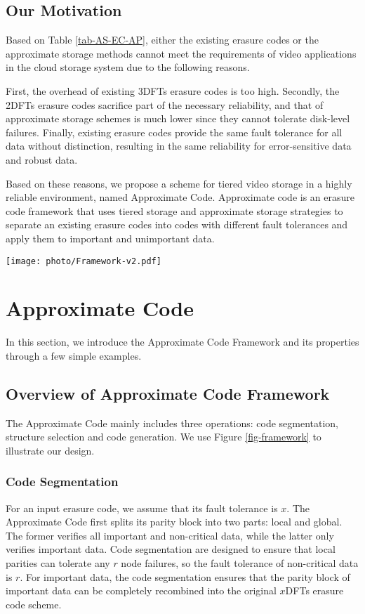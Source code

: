 \documentclass[sigconf]{acmart}
\begin{document}
\subsection{Our Motivation}
Based on Table \ref{tab-AS-EC-AP}, either the existing erasure codes or the approximate storage methods cannot meet the requirements of video applications in the cloud storage system due to the following reasons. 

First, the overhead of existing 3DFTs erasure codes is too high.
Secondly, the 2DFTs erasure codes sacrifice part of the necessary reliability, and that of approximate storage schemes is much lower since they cannot tolerate disk-level failures.
Finally, existing erasure codes provide the same fault tolerance for all data without distinction, resulting in the same reliability for error-sensitive data and robust data.

Based on these reasons, we propose a scheme for tiered video storage in a highly reliable environment, named Approximate Code.
Approximate code is an erasure code framework that uses tiered storage\cite{krish2014hats} \cite{wang2014balancing} \cite{zhang2010automated} \cite{udipi2012lot} and approximate storage strategies to separate an existing erasure codes into codes with different fault tolerances and apply them to important and unimportant data.

\begin{figure*}[ht!]
\centering
\texttt{[image: photo/Framework-v2.pdf]}
\caption{The framework of Approximate Code}
\label{fig-framework}
\end{figure*}

\section{Approximate Code}\label{ApCode}
In this section, we introduce the Approximate Code Framework and its properties through a few simple examples. 

\subsection{Overview of Approximate Code Framework}
The Approximate Code mainly includes three operations: code segmentation, structure selection and code generation. We use Figure \ref{fig-framework} to illustrate our design.

\subsubsection{Code Segmentation}
For an input erasure code, we assume that its fault tolerance is $x$. The Approximate Code first splits its parity block into two parts: local and global. The former verifies all important and non-critical data, while the latter only verifies important data. Code segmentation are designed to ensure that local parities can tolerate any $r$ node failures, so the fault tolerance of non-critical data is $r$. For important data, the code segmentation ensures that the parity block of important data can be completely recombined into the original $x$DFTs erasure code scheme. 
\end{document}
